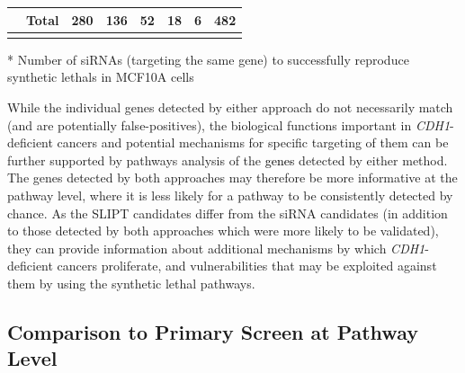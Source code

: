 \begin{table}[!ht]
\begin{center}
{\begin{threeparttable}
\begin{tabular}{>{\cellcolor{white}}rrcccccl}
\rowcolor{black!5}
\cellcolor{white}                                                           & \multicolumn{1}{r|}{\cellcolor{white} \bfseries Total}            & \multicolumn{1}{c}{280} & \multicolumn{1}{c}{136} & \multicolumn{1}{c}{52} & \multicolumn{1}{c}{18} & \multicolumn{1}{c|}{6}   & \multicolumn{1}{l|}{482}                  \\ \cline{3-8} 
\end{tabular} 
\begin{tablenotes}
\raggedright %
\item[*] Number of \glspl{siRNA} (targeting the same gene) to successfully reproduce \glspl{synthetic lethal} in MCF10A cells \citep{Telford2015}

\end{tablenotes}
\end{threeparttable}
}
\end{center}
\end{table}

While the individual genes detected by either approach do not necessarily match (and are potentially false-positives), the biological functions important in \textit{CDH1}-deficient cancers and potential mechanisms for specific targeting of them can be further supported by \glspl{pathway} analysis of the \textcolor{black}{genes} detected by either method. The genes detected by both approaches may therefore be more informative at the \gls{pathway} level, where it is less likely for a \gls{pathway} to be consistently detected by chance. As the \gls{SLIPT} candidates differ from the \gls{siRNA} candidates (in addition to those detected by both approaches which were more likely to be validated), they can provide information about additional mechanisms by which \textit{CDH1}-deficient cancers proliferate, and vulnerabilities that may be exploited against them by using the \gls{synthetic lethal} \glspl{pathway}.

\FloatBarrier

\subsection{Comparison to Primary Screen at Pathway Level}  \label{chapt3:compare_pathway}

